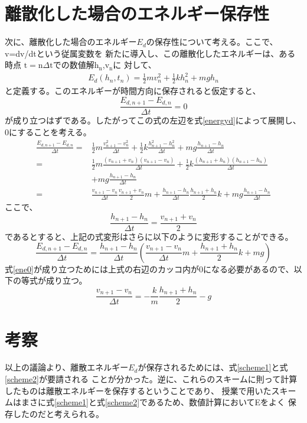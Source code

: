 \documentclass[12pt]{ltjsarticle}
\begin{document}
\section{離散化した場合のエネルギー保存性}
次に、離散化した場合のエネルギー$E_d$の保存性について考える。ここで、v=dv/dtという従属変数を
新たに導入し、この離散化したエネルギーは、ある時点
$\text{t}=\text{n}\Delta\text{t}$での数値解$\text{h}_\text{n}$,$\text{v}_\text{n}$に
対して、
\begin{eqnarray}
    E_d (h_n,t_n) = \frac{1}{2}mv_n^2 + \frac{1}{2}kh_n^2 + mgh_n
    \label{energyd}
\end{eqnarray}
と定義する。このエネルギーが時間方向に保存されると仮定すると、
\begin{equation}
    \frac{E_{d,n+1}-E_{d,n}}{\Delta t} = 0
    \label{ene0}
\end{equation}
が成り立つはずである。したがってこの式の左辺を式\ref{energyd}によって展開し、0にすることを考える。
\begin{equation*}
    \begin{split}
        \frac{E_{d,n+1}-E_{d,n}}{\Delta t} =&　\frac{1}{2}m\frac{v_{n+1}^2 - v_n^2}{\Delta t}
        + \frac{1}{2}k\frac{h_{n+1}^2 - h_n^2}{\Delta t} + mg\frac{h_{n+1}-h_n}{\Delta t} \\
        = &\frac{1}{2}m\frac{(v_{n+1}+v_n)(v_{n+1}-v_n)}{\Delta t}+\frac{1}{2}k\frac{(h_{n+1}+h_n)(h_{n+1}-h_n)}{\Delta t} \\
        &+mg\frac{h_{n+1}-h_n}{\Delta t} \\
        = &\frac{v_{n+1}-v_n}{\Delta t}\frac{v_{n+1}+v_n}{2}m+\frac{h_{n+1}-h_n}{\Delta t}\frac{h_{n+1}+h_n}{2}k
        +mg\frac{h_{n+1}-h_n}{\Delta t}
\end{split}
\end{equation*}
ここで、
\begin{equation}
    \frac{h_{n+1}-h_n}{\Delta t}=\frac{v_{n+1}+v_n}{2}
    \label{scheme1}
\end{equation}
であるとすると、上記の式変形はさらに以下のように変形することができる。
\begin{equation*}
        \frac{E_{d,n+1}-E_{d,n}}{\Delta t} =　\frac{h_{n+1}-h_n}{\Delta t}\left(\frac{v_{n+1}-v_n}{\Delta t}m
        + \frac{h_{n+1}+h_n}{2}k + mg\right)
\end{equation*}
式\ref{ene0}が成り立つためには上式の右辺のカッコ内が0になる必要があるので、以下の等式が成り立つ。
\begin{equation}
    \frac{v_{n+1}-v_n}{\Delta t}　= -\frac{k}{m} \frac{h_{n+1}+h_n}{2} - g
    \label{scheme2}
\end{equation}
\section{考察}
以上の議論より、離散エネルギー$E_d$が保存されるためには、式\ref{scheme1}と式\ref{scheme2}が要請される
ことが分かった。逆に、これらのスキームに則って計算したものは離散エネルギーを保存するということであり、
授業で用いたスキームはまさに式\ref{scheme1}と式\ref{scheme2}であるため、数値計算においてEをよく
保存したのだと考えられる。
\end{document}
